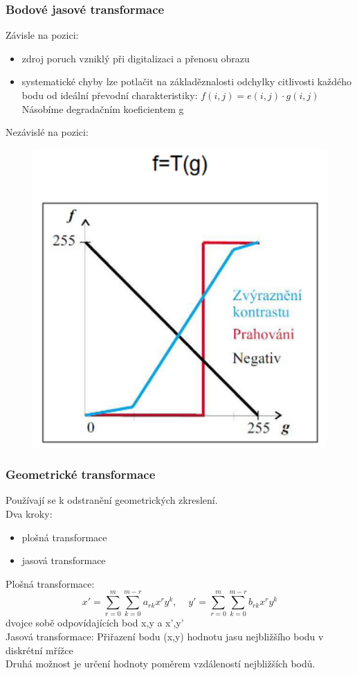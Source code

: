 \subsubsection*{Bodové jasové transformace}
Závisle na pozici:
\begin{itemize}
    \item zdroj poruch vzniklý při digitalizaci a přenosu obrazu
    \item systematické chyby lze potlačit na základěznalosti odchylky citlivosti každého bodu od ideální převodní charakteristiky:
      $f(i,j) = e(i,j)\cdot g(i,j)$\\
    Násobíme degradačním koeficientem g
\end{itemize}
\newpage
Nezávislé na pozici:
\begin{figure}[H]
    \includegraphics[scale = 0.13]{images/transf_krivka.png}
\end{figure}

\subsubsection*{Geometrické transformace}
Používají se k odstranění geometrických zkreslení.\\
Dva kroky:
\begin{itemize}
    \item plošná transformace
    \item jasová transformace
\end{itemize}
Plošná transformace:
\begin{equation}
       x' = \sum_{r =0}^m \sum_{k=0}^{m-r}a_{rk}x^ry^k, \;\;\;\; y' = \sum_{r =0}^m \sum_{k=0}^{m-r}b_{rk}x^ry^k
\end{equation}
dvojce sobě odpovídajících bod x,y a x',y'\\
Jasová transformace:
Přiřazení bodu (x,y) hodnotu jasu nejbližšího bodu v diskrétní mřížce\\
Druhá možnost je určení hodnoty poměrem vzdáleností nejbližších bodů.\\
\newpage
